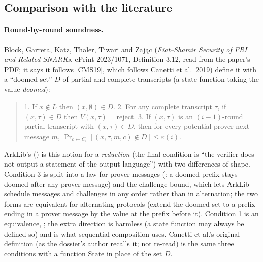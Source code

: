 \subsection{Comparison with the literature}\label{sec:gen-lib-ark-literature}

\paragraph{Round-by-round soundness.} Block, Garreta, Katz, Thaler, Tiwari and Zając
(\emph{Fiat--Shamir Security of FRI and Related SNARKs}, ePrint 2023/1071, Definition 3.12, read
from the paper's PDF; it says it follows [CMS19], which follows Canetti et al.\ 2019) define it
with a \enquote{doomed set} $D$ of partial and complete transcripts (a state function taking the
value \emph{doomed}):
\begin{quote}\small
1. If $x \notin L$ then $(x, \emptyset) \in D$. 2. For any complete transcript $\tau$, if
$(x, \tau) \in D$ then $V(x, \tau) = \mathrm{reject}$. 3. If $(x, \tau)$ is an $(i-1)$-round
partial transcript with $(x, \tau) \in D$, then for every potential prover next message $m$,
$\Pr_{c \leftarrow C_i}[(x, \tau, m, c) \notin D] \le \varepsilon(i)$.
\end{quote}
ArkLib's  (\allowbreak{}) is this notion
for a \emph{reduction} (the final condition is \enquote{the verifier does not output a statement
of the output language}) with two differences of shape. Condition 3 is split into a law for prover
messages (: a doomed prefix stays doomed after any prover message) and the
challenge bound, which lets ArkLib schedule messages and challenges in any order rather than in
alternation; the two forms are equivalent for alternating protocols (extend the doomed set to a
prefix ending in a prover message by the value at the prefix before it). Condition 1 is an
equivalence, ; the extra direction is harmless (a state
function may always be defined so) and is what sequential composition uses. Canetti et al.'s
original definition (as the dossier's author recalls it; not re-read) is the same three conditions
with a function $\mathrm{State}$ in place of the set $D$.

